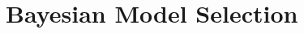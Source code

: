 \documentclass[a4paper,10pt]{article}
\begin{document}
% 

\section*{Bayesian Model Selection}
\end{document}
